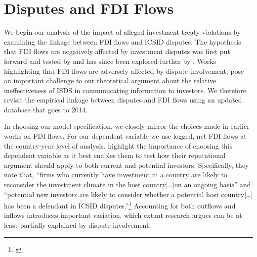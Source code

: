 \documentclass[12pt,onesided]{amsart}
\begin{document}

\section*{Disputes and FDI Flows}

We begin our analysis of the impact of alleged investment treaty violations by examining the linkage between FDI flows and ICSID disputes. The hypothesis that FDI flows are negatively affected by investment disputes was first put forward and tested by \citet{allee:peinhardt:2011} and has since been explored further by \citet{aisbettbilateral}. Works highlighting that FDI flows are adversely affected by dispute involvement, pose an important challenge to our theoretical argument about the relative ineffectiveness of ISDS in communicating information to investors. We therefore revisit the empirical linkage between disputes and FDI flows using an updated database that goes to 2014.


In choosing our model specification, we closely mirror the choices made in earlier works on FDI flows. For our dependent variable we use logged, net FDI flows at the country-year level of analysis. \citeauthor{allee:peinhardt:2011} highlight the importance of choosing this dependent variable as it best enables them to test how their reputational argument should apply to both current and potential investors. Specifically, they note that, ``firms who currently have investment in a country are likely to reconsider the investment climate in the host country[\ldots]on an ongoing basis'' and ``potential new investors are likely to consider whether a potential host country[\ldots] has been a defendant in ICSID disputes.''\footnote{\citet[419--420]{allee:peinhardt:2011}} Accounting for both outflows and inflows introduces important variation, which extant research argues can be at least partially explained by dispute involvement. 
\end{document}
